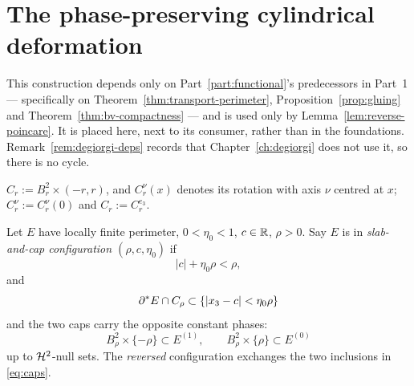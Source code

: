 \chapter{The phase-preserving cylindrical deformation}\label{ch:deformation}

\begin{remark}[Placement]\label{rem:deformation-placement}
This construction depends only on Part~\ref{part:functional}'s predecessors in
Part~1 --- specifically on Theorem~\ref{thm:transport-perimeter},
Proposition~\ref{prop:gluing} and Theorem~\ref{thm:bv-compactness} --- and is
used only by Lemma~\ref{lem:reverse-poincare}.  It is placed here, next to its
consumer, rather than in the foundations.  Remark~\ref{rem:degiorgi-deps}
records that Chapter~\ref{ch:degiorgi} does not use it, so there is no cycle.
\end{remark}

\begin{notation}[Cylinders]\label{not:cylinders}
$C_r:=B_r^2\times(-r,r)$, and $C_r^\nu(x)$ denotes its rotation with axis
$\nu$ centred at $x$; $C_r^\nu:=C_r^\nu(0)$ and $C_r:=C_r^{e_3}$.
\end{notation}

\begin{definition}\label{def:slab-cap}
Let $E$ have locally finite perimeter, $0<\eta_0<1$, $c\in\mathbb R$, $\rho>0$.
Say $E$ is in
\emph{slab-and-cap configuration $(\rho,c,\eta_0)$} if
\begin{equation}\label{eq:slab-clearance}
  |c|+\eta_0\rho<\rho,
\end{equation}
and
\begin{equation}\label{eq:slab}
  \partial^* E\cap C_\rho\subset\{|x_3-c|<\eta_0\rho\}
\end{equation}
and the two caps carry the opposite constant phases:
\begin{equation}\label{eq:caps}
  B_\rho^2\times\{-\rho\}\subset E^{(1)},
  \qquad
  B_\rho^2\times\{\rho\}\subset E^{(0)}
\end{equation}
up to $\mathcal H^2$-null sets.  The \emph{reversed} configuration exchanges the two
inclusions in \eqref{eq:caps}.
\end{definition}

